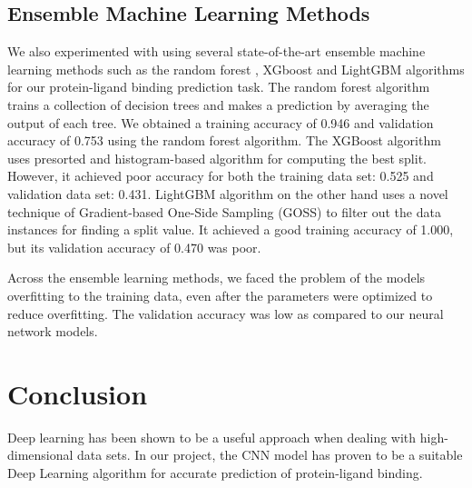 \documentclass[11pt]{article}
\begin{document}
\subsection{Ensemble Machine Learning Methods}
We also experimented with using several state-of-the-art ensemble machine learning methods such as the random forest \cite{breiman2001random}, XGboost \cite{chen2016xgboost} and LightGBM \cite{ke2017lightgbm} algorithms for our protein-ligand binding prediction task. The random forest algorithm trains a collection of decision trees and makes a prediction by averaging the output of each tree. We obtained a training accuracy of 0.946 and validation accuracy of 0.753 using the random forest algorithm. The XGBoost algorithm  uses presorted and histogram-based algorithm for computing the best split. However, it achieved poor accuracy for both the training data set: 0.525 and validation data set: 0.431. LightGBM algorithm on the other hand uses a novel technique of Gradient-based One-Side Sampling (GOSS) to filter out the data instances for finding a split value. It achieved a good training accuracy of 1.000, but  its validation accuracy of 0.470 was poor.

Across the ensemble learning methods, we faced the problem of the models overfitting to the training data, even after the parameters were optimized to reduce overfitting. The validation accuracy was low as compared to our neural network models.

\section{Conclusion}
Deep learning has been shown to be a useful approach when dealing with high-dimensional data sets. In our project, the CNN model has proven to be a suitable Deep Learning algorithm for accurate prediction of protein-ligand binding. 



\clearpage

\clearpage


\end{document}
